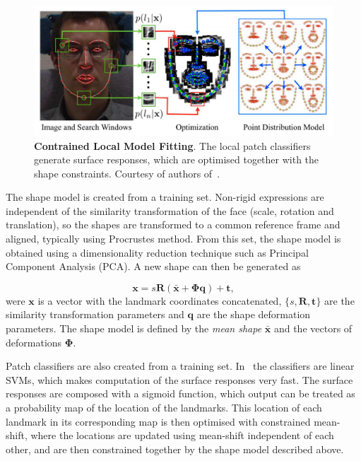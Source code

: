 \documentclass[]{article}
\begin{document}
\begin{figure}[htbp]
  \centering
  \includegraphics[width=12cm]{figures/CLM.png}
  \caption{\textbf{Contrained Local Model Fitting}. The local patch classifiers generate surface responses, which are
  optimised together with the shape constraints. Courtesy of authors of~\cite{saragih2011deformable}.}
  \label{fig:CLM}
\end{figure}

The shape model is created from a training set. Non-rigid expressions are independent of the similarity transformation
of the face (scale, rotation and translation), so the shapes are transformed to a common reference frame and aligned,
typically using Procrustes method. From this set, the shape model is obtained using a dimensionality reduction technique
such as Principal Component Analysis (PCA). A new shape can then be generated as


\begin{equation}
  \label{eq:shape_model}
  \mathbf{x} = s\mathbf{R}(\bar{\mathbf{x}} +
  \boldsymbol{\Phi}\mathbf{q}) + \mathbf{t},
\end{equation}
were $\mathbf{x}$ is a vector with the landmark coordinates concatenated, 
$\{s,\mathbf{R},\mathbf{t}\}$ are the similarity transformation
parameters and $\mathbf{q}$ are the shape deformation parameters. The
shape model is defined by the \textit{mean shape} $\mathbf{\bar{x}}$
and the vectors of deformations $\boldsymbol{\Phi}$.


Patch classifiers are also created from a training set. In~\cite{saragih2011deformable} the classifiers are linear SVMs,
which makes computation of the surface responses very fast. The surface responses are composed with a sigmoid function,
which output can be treated as a probability map of the location of the landmarks. This location of each landmark in its
corresponding map is then optimised with constrained mean-shift, where the locations are updated using mean-shift
independent of each other, and are then constrained together by the shape model described above.
\end{document}
